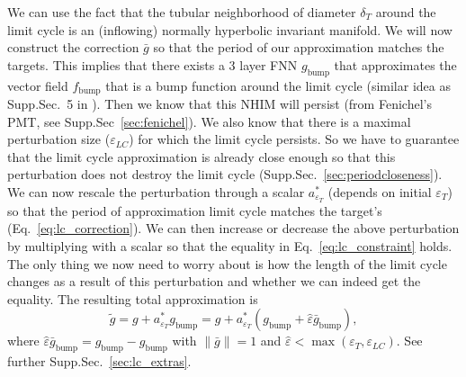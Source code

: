 \documentclass{article}
\theoremstyle{definition} \newtheorem{definition}{Definition}
\theoremstyle{remark} \newtheorem{remark}{Remark}
\newcounter{ct}
\begin{document}
We can use the fact that the tubular neighborhood of diameter $\delta_T$ around the limit cycle is an (inflowing) normally hyperbolic invariant manifold.
We will now construct the correction $\bar{g}$ so that the period of our approximation matches the targets.
This implies that there exists a 3 layer FNN $g_{\operatorname{bump}}$ that approximates the vector field $f_{\operatorname{bump}}$ that is a bump function around the limit cycle (similar idea as Supp.Sec.~5 in \citep{Sagodi2024a}). %
Then we know that this NHIM will persist (from Fenichel's PMT, see Supp.Sec~\ref{sec:fenichel}).
We also know that there is a maximal perturbation size ($\varepsilon_{LC}$) for which the limit cycle persists.
So we have to guarantee that the limit cycle approximation is already close enough so that this perturbation does not destroy the limit cycle (Supp.Sec.~\ref{sec:periodcloseness}). %
We can now rescale the perturbation through a scalar $a_{\varepsilon_T}^*$ (depends on initial $\varepsilon_T$) so that the period of approximation limit cycle matches the target's (Eq.~\ref{eq:lc_correction}). 
We can then increase or decrease the above perturbation by multiplying with a scalar so that the equality in Eq.~\ref{eq:lc_constraint} holds.
The only thing we now need to worry about is how the length of the limit cycle changes as a result of this perturbation and whether we can indeed get the equality.
%
The resulting total approximation is %
\begin{equation}\label{eq:lc_correction}
\tilde{g}= g+a_{\varepsilon_T}^*g_{\operatorname{bump}} = 
g + a_{\varepsilon_T}^*(g_{\operatorname{bump}}+ \hat{\varepsilon}\bar{g}_{\operatorname{bump}}),
 \end{equation}
where $\hat{\varepsilon}\bar{g}_{\operatorname{bump}} = g_{\operatorname{bump}} - g_{\operatorname{bump}}$ with $\|\bar g\|=1$ and $\hat \varepsilon <\max(\varepsilon_T,\varepsilon_{LC})$. %
%
See further Supp.Sec.~\ref{sec:lc_extras}.
\end{document}
